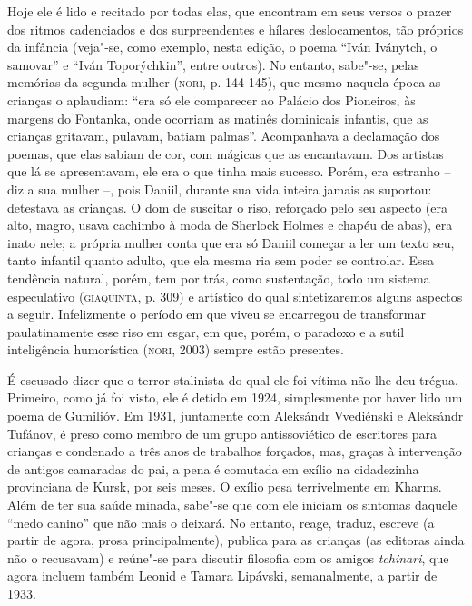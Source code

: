 Hoje ele é lido e recitado por todas elas, que encontram em seus versos
o prazer dos ritmos cadenciados e dos surpreendentes e hílares
deslocamentos, tão próprios da infância (veja"-se, como exemplo, nesta
edição, o poema ``Iván Iványtch, o samovar'' e ``Iván Toporýchkin'',
entre outros). No entanto, sabe"-se, pelas memórias da segunda mulher
(\textsc{nori}, p. 144-145), que mesmo naquela época as crianças o
aplaudiam: ``era só ele comparecer ao Palácio dos Pioneiros, às margens
do Fontanka, onde ocorriam as matinês dominicais infantis, que as
crianças gritavam, pulavam, batiam palmas''. Acompanhava a declamação
dos poemas, que elas sabiam de cor, com mágicas que as encantavam. Dos
artistas que lá se apresentavam, ele era o que tinha mais sucesso.
Porém, era estranho -- diz a sua mulher --, pois Daniil, durante sua
vida inteira jamais as suportou: detestava as crianças. O dom de
suscitar o riso, reforçado pelo seu aspecto (era alto, magro, usava
cachimbo à moda de Sherlock Holmes e chapéu de abas), era inato nele; a
própria mulher conta que era só Daniil começar a ler um texto seu, tanto
infantil quanto adulto, que ela mesma ria sem poder se controlar. Essa
tendência natural, porém, tem por trás, como sustentação, todo um
sistema especulativo (\textsc{giaquinta}, p. 309) e artístico do qual
sintetizaremos alguns aspectos a seguir. Infelizmente o período em que
viveu se encarregou de transformar paulatinamente esse riso em esgar, em
que, porém, o paradoxo e a sutil inteligência humorística
(\textsc{nori}, 2003) sempre estão presentes.

É escusado dizer que o terror stalinista do qual ele foi vítima não lhe
deu trégua. Primeiro, como já foi visto, ele é detido em 1924,
simplesmente por haver lido um poema de Gumilióv. Em 1931, juntamente
com Aleksándr Vvediénski e Aleksándr Tufánov, é preso como membro de um
grupo antissoviético de escritores para crianças e condenado a três anos
de trabalhos forçados, mas, graças à intervenção de antigos camaradas do
pai, a pena é comutada em exílio na cidadezinha provinciana de Kursk,
por seis meses. O exílio pesa terrivelmente em Kharms. Além de ter sua
saúde minada, sabe"-se que com ele iniciam os sintomas daquele ``medo
canino'' que não mais o deixará. No entanto, reage, traduz, escreve (a
partir de agora, prosa principalmente), publica para as crianças (as
editoras ainda não o recusavam) e reúne"-se para discutir filosofia com
os amigos \emph{tchinari}, que agora incluem também Leonid e Tamara
Lipávski, semanalmente, a partir de 1933.

